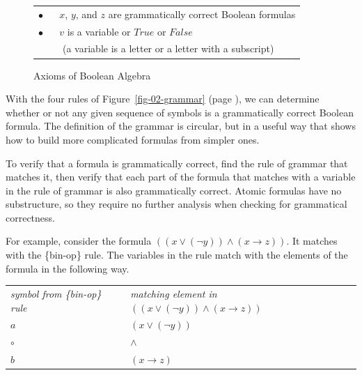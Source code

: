 \begin{figure}
\begin{center}
\begin{tabular}{l}
\hline
$\bullet$ ~~ $x$, $y$, and $z$ are grammatically correct Boolean formulas \\
$\bullet$ ~~ $v$ is a variable or $True$ or $False$ \\
~~~~~(a variable is a letter or a letter with a subscript) \\
\hline
\end{tabular}
\end{center}
\caption{Axioms of Boolean Algebra}
\label{fig-02-boolean-axioms}
\end{figure}

With the four rules of
Figure~\ref{fig-02-grammar} (page \pageref{fig-02-grammar}),
we can determine whether or not any given sequence of symbols
is a grammatically correct Boolean formula.
The definition of the grammar is circular,
but in a useful way that shows
how to build more complicated formulas from simpler ones.

To verify that a formula is grammatically correct,
find the rule of grammar that matches it,
then verify that each part of the formula
that matches with a variable in the rule of grammar
is also grammatically correct.
Atomic formulas have no substructure,
so they require no further analysis when checking for grammatical correctness.

For example, consider the formula
$((x \vee (\neg y)) \wedge (x \rightarrow z))$.
It matches with the \{bin-op\} rule.
The variables in the rule match
with the elements of the formula in the following way.
\begin{center}
\begin{tabular}{ll}
\emph{symbol from \{bin-op\} rule}      & \emph{matching element in} $((x \vee (\neg y)) \wedge (x \rightarrow z))$ \\
$a$                                     & $(x \vee (\neg y))$ \\
$\circ$                                 & $\wedge$ \\
$b$                                     & $(x \rightarrow z)$ \\
\end{tabular}
\end{center}

